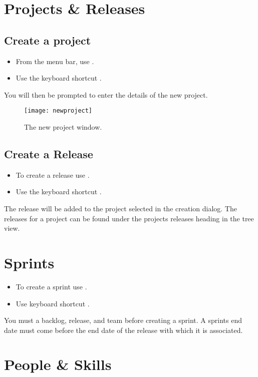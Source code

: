 \documentclass[11pt,fleqn]{book} %
\begin{document}
\section{Projects \& Releases}
\subsection{Create a project}
    \begin{itemize}
        \item From the menu bar, use .
        \item Use the keyboard shortcut .
    \end{itemize}
    You will then be prompted to enter the details of the new project.

    \begin{figure}[h]
        \centering
        \texttt{[image: newproject]}
        \caption{The new project window.\label{newproject}}
    \end{figure}

\subsection{Create a Release}
    \begin{itemize}
        \item To create a release use .
        \item Use the keyboard shortcut .
    \end{itemize}
    The release will be added to the project selected in the creation dialog.
    The releases for a project can be found under the projects releases heading in the tree view.

\section{Sprints}
  \begin{itemize}
    \item To create a sprint use .
    \item Use keyboard shortcut .
  \end{itemize}
  You must a backlog, release, and team before creating a sprint.
  A sprints end date must come before the end date of the release with which it is associated.

\section{People \& Skills}
\end{document}
